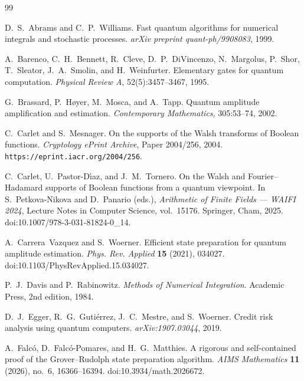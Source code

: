 \documentclass[12pt,a4paper]{article}
\theoremstyle{plain}
\theoremstyle{definition}
\theoremstyle{remark}
\begin{document}

\begin{thebibliography}{99}

D.~S.~Abrams and C.~P.~Williams.
\newblock Fast quantum algorithms for numerical integrals and stochastic
  processes.
\newblock \textit{arXiv preprint quant-ph/9908083}, 1999.

A.~Barenco, C.~H.~Bennett, R.~Cleve, D.~P.~DiVincenzo, N.~Margolus,
  P.~Shor, T.~Sleator, J.~A.~Smolin, and H.~Weinfurter.
\newblock Elementary gates for quantum computation.
\newblock \textit{Physical Review A}, 52(5):3457--3467, 1995.

G.~Brassard, P.~H{\o}yer, M.~Mosca, and A.~Tapp.
\newblock Quantum amplitude amplification and estimation.
\newblock \textit{Contemporary Mathematics}, 305:53--74, 2002.

C.~Carlet and S.~Mesnager.
\newblock On the supports of the {Walsh} transforms of {Boolean} functions.
\newblock \textit{Cryptology ePrint Archive}, Paper 2004/256, 2004.
\newblock \texttt{https://eprint.iacr.org/2004/256}.

C.~Carlet, U.~Pastor-D\'{\i}az, and J.~M.~Tornero.
\newblock On the {Walsh} and {Fourier--Hadamard} supports of {Boolean}
  functions from a quantum viewpoint.
\newblock In S.~Petkova-Nikova and D.~Panario (eds.),
  \textit{Arithmetic of Finite Fields --- WAIFI 2024},
  Lecture Notes in Computer Science, vol.~15176.
  Springer, Cham, 2025.
\newblock doi:10.1007/978-3-031-81824-0\_14.

A.~Carrera~Vazquez and S.~Woerner.
\newblock Efficient state preparation for quantum amplitude estimation.
\newblock \textit{Phys. Rev. Applied} \textbf{15} (2021), 034027.
\newblock doi:10.1103/PhysRevApplied.15.034027.

P.~J.~Davis and P.~Rabinowitz.
\newblock \textit{Methods of Numerical Integration}.
\newblock Academic Press, 2nd edition, 1984.

D.~J.~Egger, R.~G.~Guti\'{e}rrez, J.~C.~Mestre, and S.~Woerner.
\newblock Credit risk analysis using quantum computers.
\newblock \textit{arXiv:1907.03044}, 2019.

A.~Falc\'{o}, D.~Falc\'{o}-Pomares, and H.~G.~Matthies.
\newblock A rigorous and self-contained proof of the {Grover--Rudolph} state
  preparation algorithm.
\newblock \textit{AIMS Mathematics} \textbf{11} (2026), no.~6, 16366--16394.
\newblock doi:10.3934/math.2026672.


\end{thebibliography}
\end{document}
